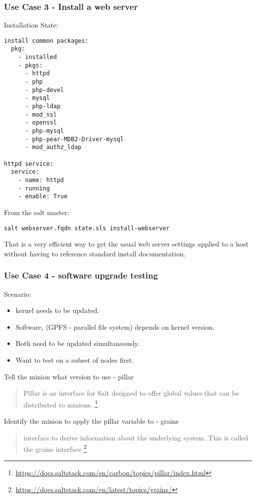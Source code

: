 \documentclass{beamer}
\begin{document}
\begin{frame}[fragile]
\frametitle{Use Case 3 - Install a web server}
Installation State:
\begin{lstlisting}[basicstyle=\tiny,]
install common packages:
  pkg:
    - installed
    - pkgs:
      - httpd
      - php
      - php-devel
      - mysql
      - php-ldap
      - mod_ssl
      - openssl
      - php-mysql
      - php-pear-MDB2-Driver-mysql
      - mod_authz_ldap

httpd service:
  service:
    - name: httpd
    - running
    - enable: True
\end{lstlisting}
From the salt master:
\begin{lstlisting}[basicstyle=\tiny,]
salt webserver.fqdn state.sls install-webserver
\end{lstlisting}
That is a very efficient way to get the usual web server settings applied to a host without having to reference standard install documentation.
\end{frame}

\begin{frame}
\frametitle{Use Case 4 - software upgrade testing}
Scenario:\\
\begin{itemize}
\item kernel needs to be updated.
\item Software, (GPFS - parallel file system) depends on kernel version.
\item Both need to be updated simultaneously.
\item Want to test on a subset of nodes first.
\end{itemize}
Tell the minion what version to use - pillar\\
\begin{quote}
Pillar is an interface for Salt designed to offer global values that can be distributed to minions.
\footnote{\url{https://docs.saltstack.com/en/carbon/topics/pillar/index.html}}
\end{quote}
Identify the minion to apply the pillar variable to - grains\\
\begin{quote}
interface to derive information about the underlying system. This is called the grains interface
\footnote{\url{https://docs.saltstack.com/en/latest/topics/grains/}}
\end{quote}
\end{frame}
\end{document}
